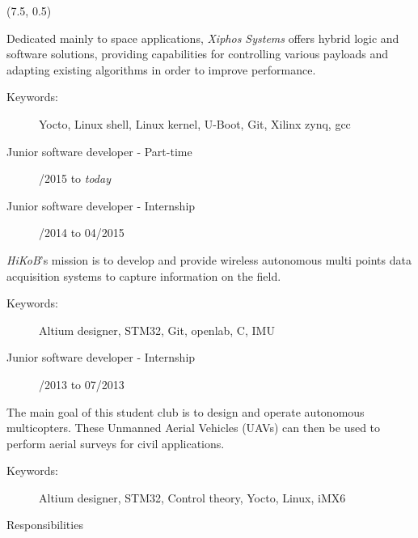 	\begin{textblock}{13.5}(7.5, 0.5)

		Dedicated mainly to space applications, {\em Xiphos Systems} offers hybrid
		logic and software solutions, providing capabilities for controlling
		various payloads and adapting existing algorithms in order to improve
		performance.

		\begin{description}
			\item[Keywords:] Yocto, Linux shell, Linux kernel, U-Boot, Git, Xilinx zynq, gcc
			\item[Junior software developer - Part-time] /2015 to \emph{today}
			\item[Junior software developer - Internship] /2014 to 04/2015
		\end{description}

		{\em HiKoB}'s mission is to develop and provide wireless autonomous multi points
		data acquisition systems to capture information on the field.

		\begin{description}
			\item[Keywords:] Altium designer, STM32, Git, openlab, C, IMU
			\item[Junior software developer - Internship] /2013 to 07/2013
		\end{description}


		The main goal of this student club is to design and operate autonomous multicopters.
		These Unmanned Aerial Vehicles (UAVs) can then be used to perform aerial surveys for
		civil applications.

		\begin{description}
			\item[Keywords:] Altium designer, STM32, Control theory, Yocto, Linux, iMX6
			\item[Responsibilities] \hfill
		\end{description}


\end{textblock}
